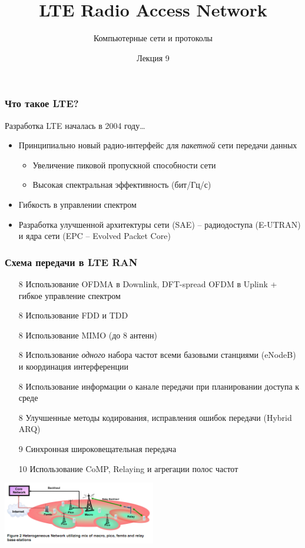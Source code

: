 \documentclass[utf8]{beamer}
\title{LTE Radio Access Network}
\author {Компьютерные сети и протоколы}
\date{Лекция 9}
\begin{document}
\begin{frame}
\titlepage
\end{frame}
\begin{frame}
\frametitle{Что такое LTE?}
Разработка LTE началась в 2004 году\ldots
\begin{itemize}
\item Принципиально новый радио-интерфейс для \emph{пакетной} сети передачи данных
	\begin{itemize}
	 \item Увеличение пиковой пропускной способности сети
	 \item Высокая спектральная эффективность (бит/Гц/с)
	\end{itemize}
\item Гибкость в управлении спектром
\item Разработка улучшенной архитектуры сети (SAE) -- радиодоступа (E-UTRAN) и ядра сети (EPC -- Evolved Packet Core)
\end{itemize}
\end{frame}
\begin{frame}
\frametitle{Схема передачи в LTE RAN}
\begin{itemize}
 \item[8] Использование OFDMA в Downlink,  DFT-spread OFDM в Uplink + гибкое управление спектром
 \item[8] Использование FDD и TDD
 \item[8] Использование MIMO (до 8 антенн)
 \item[8] Использование \emph{одного} набора частот всеми базовыми станциями (eNodeB) и координация интерференции
 \item[8] Использование информации о канале передачи при планировании доступа к среде
 \item[8] Улучшенные методы кодирования, исправления ошибок передачи (Hybrid ARQ)
 \item[9] Синхронная широковещательная передача
 \item[10] Использование CoMP, Relaying и агрегации полос частот
\end{itemize}
\begin{center}
\includegraphics[width=0.5\textwidth]{pic/relay.png}
\end{center}
\end{frame}
\end{document}
